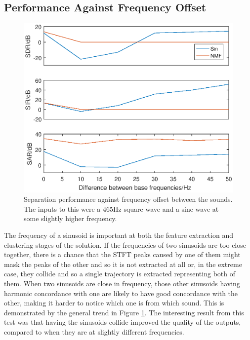 \documentclass[12pt,a4paper,twoside,openright]{report}
\begin{document}
\subsection{Performance Against Frequency Offset}


\begin{figure}
\centering
\includegraphics[width=0.7\linewidth]{./FrequencyPlot}
\caption[Separation performance against frequency offset between the sounds.]{Separation performance against frequency offset between the sounds. The inputs to this were a $ 465 $Hz square wave and a sine wave at some slightly higher frequency.}
\label{fig:FrequencyPlot}
\end{figure}

The frequency of a sinusoid is important at both the feature extraction and clustering stages of the solution. If the frequencies of two sinusoids are too close together, there is a chance that the STFT peaks caused by one of them might mask the peaks of the other and so it is not extracted at all or, in the extreme case, they collide and so a single trajectory is extracted representing both of them. When two sinusoids are close in frequency, those other sinusoids having harmonic concordance with one are likely to have good concordance with the other, making it harder to notice which one is from which sound. This is demonstrated by the general trend in Figure \ref{fig:FrequencyPlot}. The interesting result from this test was that having the sinusoids collide improved the quality of the outputs, compared to when they are at slightly different frequencies.

\end{document}
